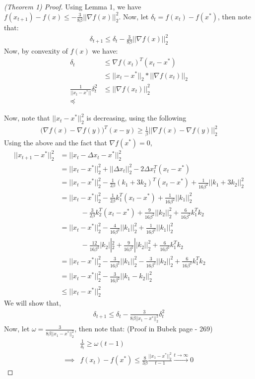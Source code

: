 \documentclass[12pt,twoside]{article}
\begin{document}
\begin{proof}[(Theorem 1) Proof]
Using Lemma 1, we have $f(x_{t+1}) - f(x) \leq -\frac{3}{8\beta}|| \nabla f(x) ||_2^2 $. Now, let $\delta_t = f(x_t) - f(x^*)$, then note that:
\begin{align*}
\delta_{t+1} \leq \delta_t - \frac{3}{8\beta}|| \nabla f(x) ||_2^2
\end{align*}
Now, by convexity of $f(x)$ we have:
\begin{align}
\delta_t &\leq \nabla f(x_t)^T (x_t - x^*) \\
 &\leq || x_t - x^* ||_2 * || \nabla f(x_t) ||_2 \\
\frac{1}{|| x_t - x^* || }\delta_t^2 & \leq  || \nabla f(x_t) ||_2^2 \\
\preceq
\end{align}

Now, note that $|| x_t - x^*||_2^2$ is decreasing, using the following
\begin{align*}
\big( \nabla f(x) - \nabla f(y)  \big)^T(x-y)  \geq \frac{1}{\beta} || \nabla f(x) - \nabla f(y) ||_2^2
\end{align*}
Using the above and the fact that $\nabla f(x^*) = 0$, 
\begin{align*}
|| x_{t+1} - x^* ||_2^2 &= || x_t - \Delta x_t - x^* ||_2^2 \\
&= || x_t - x^* ||_2^2 + || \Delta x_t ||_2^2 - 2 \Delta x_t^T(x_t - x^*) \\
&= || x_t - x^* ||_2^2 - \frac{1}{2\beta}(k_1 + 3k_2)^T (x_t - x^*) + \frac{1}{16 \beta^2}|| k_1 + 3k_2 ||_2^2 \\
&= || x_t - x^* ||_2^2 - \frac{1}{2 \beta}k_1^T (x_t - x^*) + \frac{1}{16 \beta^2}|| k_1 ||_2^2  \\
& \quad \quad \quad - \frac{3}{2\beta}k_2^T (x_t - x^*) + \frac{9}{16 \beta^2}|| k_2 ||_2^2 + \frac{6}{16 \beta^2} k_1 ^T k_2 \\
&= || x_t - x^* ||_2^2 - \frac{4}{16 \beta^2}||k_1 ||_2^2 + \frac{1}{16 \beta^2}|| k_1 ||_2^2  \\
& \quad \quad \quad - \frac{12}{16 \beta^2}|k_2||_2^2 + \frac{9}{16 \beta^2}|| k_2 ||_2^2 + \frac{6}{16 \beta^2} k_1 ^T k_2 \\
&= || x_t - x^* ||_2^2 - \frac{3}{16 \beta^2}||k_1||_2^2 - \frac{3}{16 \beta^2}||k_2||_2^2 + \frac{6}{16 \beta^2} k_1 ^T k_2 \\
&= || x_t - x^* ||_2^2 -  \frac{3}{16 \beta^2}|| k_1 - k_2||_2^2	\\
& \leq || x_t - x^* ||_2^2
\end{align*}
We will show that,
\begin{align}
\delta_{t+1} \leq \delta_t - \frac{3}{ 8 \beta || x_1 - x^* ||_2^2} \delta_t^2
\end{align}
Now, let $\omega = \frac{3}{8 \beta   || x_1 - x^* ||_2^2}$, then note that: (Proof in Bubek page - 269)
\begin{align*}
& \frac{1}{\delta_t} \geq \omega (t-1) \\
\implies & f(x_t) - f(x^*) \leq \frac{8}{3 \beta} \frac{ || x_1 - x^* ||_2^2}{t-1} \xrightarrow{t \to \infty} 0 
\end{align*}

\end{proof}
\end{document}
